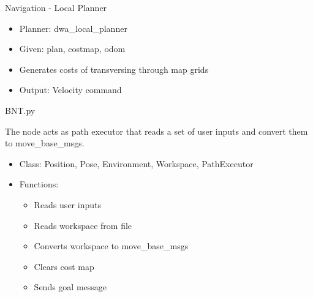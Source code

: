 \begin{frame}{Navigation - Local Planner}
\begin{itemize}
	\item Planner: dwa\_local\_planner
	\item Given: plan, costmap, odom
	\item Generates costs of transversing through map grids
	\item Output: Velocity command
\end{itemize}
\end{frame}
\begin{frame}{BNT.py}
    
    The node acts as path executor that reads  a set of user inputs and convert them to move\_base\_msgs.
    \begin{itemize}
        \item Class: Position, Pose, Environment, Workspace, PathExecutor
        
        \item Functions:
        \begin{itemize}
        	\item Reads user inputs
        	\item Reads workspace from file
            \item Converts workspace to move\_base\_msgs
            \item Clears cost map
            \item Sends goal message
        \end{itemize}
    \end{itemize}
    
\end{frame}
